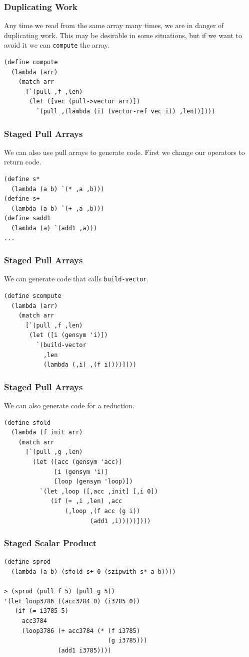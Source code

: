 \documentclass[12pt,letterpaper]{beamer}
\begin{document}
\begin{frame}[fragile]
  \frametitle{Duplicating Work}
  Any time we read from the same array many times, we are in danger of duplicating work.
  This may be desirable in some situations, but if we want to avoid it we can
  {\tt compute} the array.
\begin{lstlisting}
(define compute
  (lambda (arr)
    (match arr
      [`(pull ,f ,len)
       (let ([vec (pull->vector arr)])
         `(pull ,(lambda (i) (vector-ref vec i)) ,len))])))
\end{lstlisting}
\end{frame}

\begin{frame}[fragile]
  \frametitle{Staged Pull Arrays}
  We can also use pull arrays to generate code. 
  First we change our operators to return code.
  \begin{lstlisting}
(define s*
  (lambda (a b) `(* ,a ,b)))
(define s+
  (lambda (a b) `(+ ,a ,b)))
(define sadd1
  (lambda (a) `(add1 ,a)))
...
  \end{lstlisting}
\end{frame}


\begin{frame}[fragile]
  \frametitle{Staged Pull Arrays}
  We can generate code that calls {\tt build-vector}.
  \begin{lstlisting}
(define scompute
  (lambda (arr)
    (match arr
      [`(pull ,f ,len)
       (let ([i (gensym 'i)])
         `(build-vector
           ,len
           (lambda (,i) ,(f i))))])))
  \end{lstlisting}
\end{frame}

\begin{frame}[fragile]
  \frametitle{Staged Pull Arrays}
  We can also generate code for a reduction.
  \begin{lstlisting}
(define sfold
  (lambda (f init arr)
    (match arr
      [`(pull ,g ,len)
        (let ([acc (gensym 'acc)]
              [i (gensym 'i)]
              [loop (gensym 'loop)])
          `(let ,loop ([,acc ,init] [,i 0])
             (if (= ,i ,len) ,acc
                 (,loop ,(f acc (g i))
                        (add1 ,i)))))])))
  \end{lstlisting}
\end{frame}


\begin{frame}[fragile]
  \frametitle{Staged Scalar Product}
  \begin{lstlisting}
(define sprod
  (lambda (a b) (sfold s+ 0 (szipwith s* a b))))

> (sprod (pull f 5) (pull g 5))
'(let loop3786 ((acc3784 0) (i3785 0))
   (if (= i3785 5)
     acc3784
     (loop3786 (+ acc3784 (* (f i3785)
                             (g i3785)))
               (add1 i3785))))
  \end{lstlisting}
\end{frame}
\end{document}
